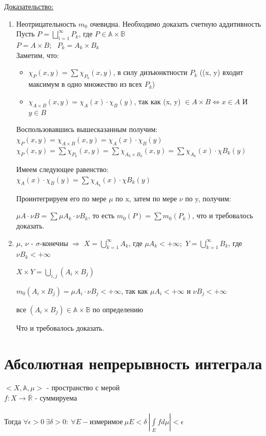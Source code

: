 \documentclass[paper=a4, fontsize=17pt]{article}
\begin{document}
\underline{Доказательство:} \\
\begin{enumerate}
	\item Неотрицательность $m_0$ очевидна. Необходимо доказать счетную аддитивность\\
	Пусть $P = \bigsqcup\limits_{i=1}^{\infty}P_{k}$, где $P \in \mathds{A} \times \mathds{B}$ \\
	$P = A \times B$; \ $P_k = A_k \times B_k$ \\
	Заметим, что:
	\begin{itemize}
		\item $\chi_P(x, y) = \sum\chi_{P_k}(x, y)$, в силу дизъюнктности $P_k$ ((x, y) входит максимум в одно множество из всех $P_k$)
		\item $\chi_{A \times B}(x, y) = \chi_A(x) \cdot \chi_B(y)$, так как (x, y) $\in A\times B \Leftrightarrow x \in A$ И $y \in B$
	\end{itemize}
Воспользовавшись вышесказанным получим:\\
$\chi_{P}(x, y) = \chi_{A\times B}(x, y) = \chi_A(x) \cdot \chi_B(y)$\\
$\chi_{P}(x, y) = \sum\chi_{P_k}(x, y) = \sum\chi_{A_k \times B_k}(x, y) = \sum\chi_{A_k}(x) \cdot \chi{B_k}(y)$

Имеем следующее равенство:\\
$\chi_A(x) \cdot \chi_B(y) = \sum\chi_{A_k}(x) \cdot \chi{B_k}(y)$

Проинтегрируем его по мере $\mu$ по x, затем по мере $\nu$ по y, получим:

$\mu A \cdot \nu B = \sum \mu A_k \cdot \nu B_k$, то есть $m_0(P) = \sum m_0(P_k)$, что и требовалось доказать.
\item $\mu$, $\nu$ - $\sigma$-конечны $\Rightarrow$
$X = \bigcup\limits_{k=1}^{\infty} A_k$, где $\mu A_k < +\infty$;\
$Y = \bigcup\limits_{k=1}^{\infty} B_k$, где $\nu B_k < +\infty$

$X \times Y = \bigcup\limits_{i, j} (A_i \times B_j)$

$m_0(A_i \times B_j) = \mu A_i \cdot \nu B_j < +\infty$, так как $\mu A_i < +\infty$ и $\nu B_j < +\infty$

все $(A_i \times B_j) \in \mathds{A} \times \mathds{B}$ по определению

Что и требовалось доказать.
\end{enumerate}

\section{Абсолютная непрерывность интеграла}
$<X, \mathds{A}, \mu>$ - пространство с мерой\\
$f : X \to \overline{\mathds{R}}$ - суммируема\\\\
Тогда $\forall \epsilon > 0 ~ \exists \delta > 0 : ~ \forall E - \text{измеримое} ~ \mu E < \delta ~ |\int\limits_{E}f d\mu| < \epsilon$
\end{document}
